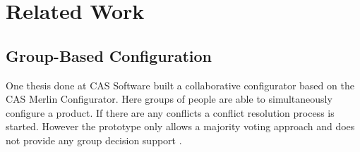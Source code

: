 \chapter{Related Work}
\label{ch:Related_Work}

\section{Group-Based Configuration}
\label{sec:Related_Work:GroupBasedConfiguration}

One thesis done at CAS Software built a collaborative configurator based on the CAS Merlin Configurator. Here groups of people are able to simultaneously configure a product. If there are any conflicts a conflict resolution process is started. However the prototype only allows a majority voting approach and does not provide any group decision support \cite{raabKollaborativeProduktkonfigurationEchtzeit2019}.